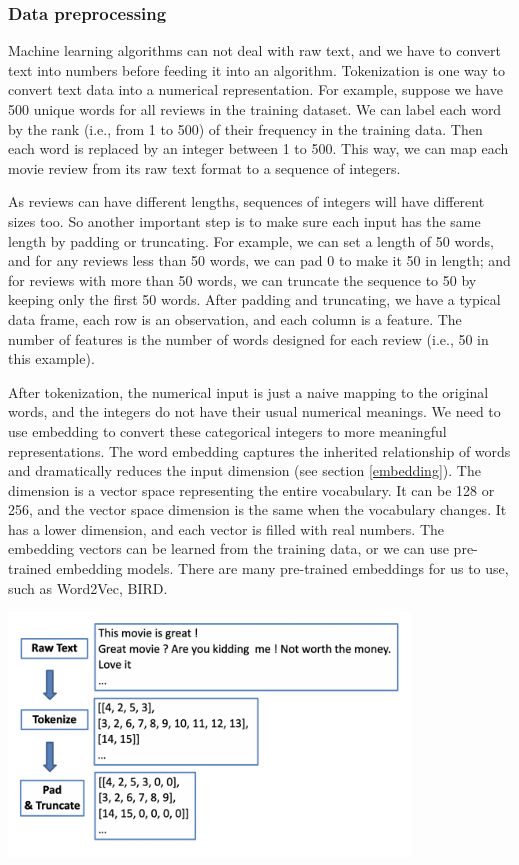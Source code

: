 \documentclass[12pt,]{krantz}
\begin{document}
\hypertarget{data-preprocessing-2}{%
\subsubsection{Data preprocessing}\label{data-preprocessing-2}}

Machine learning algorithms can not deal with raw text, and we have to convert text into numbers before feeding it into an algorithm. Tokenization is one way to convert text data into a numerical representation. For example, suppose we have 500 unique words for all reviews in the training dataset. We can label each word by the rank (i.e., from 1 to 500) of their frequency in the training data. Then each word is replaced by an integer between 1 to 500. This way, we can map each movie review from its raw text format to a sequence of integers.

As reviews can have different lengths, sequences of integers will have different sizes too. So another important step is to make sure each input has the same length by padding or truncating. For example, we can set a length of 50 words, and for any reviews less than 50 words, we can pad 0 to make it 50 in length; and for reviews with more than 50 words, we can truncate the sequence to 50 by keeping only the first 50 words. After padding and truncating, we have a typical data frame, each row is an observation, and each column is a feature. The number of features is the number of words designed for each review (i.e., 50 in this example).

After tokenization, the numerical input is just a naive mapping to the original words, and the integers do not have their usual numerical meanings. We need to use embedding to convert these categorical integers to more meaningful representations. The word embedding captures the inherited relationship of words and dramatically reduces the input dimension (see section \ref{embedding}). The dimension is a vector space representing the entire vocabulary. It can be 128 or 256, and the vector space dimension is the same when the vocabulary changes. It has a lower dimension, and each vector is filled with real numbers. The embedding vectors can be learned from the training data, or we can use pre-trained embedding models. There are many pre-trained embeddings for us to use, such as Word2Vec, BIRD.

\includegraphics[width=0.8\textwidth,height=\textheight]{images/TokenizingPadding.png}
\end{document}
